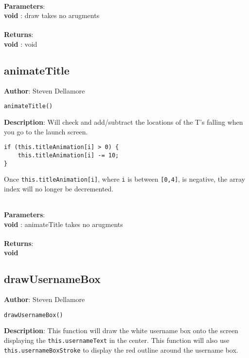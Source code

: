 \documentclass[12pt]{article}
\begin{document}
\textbf{\large{\\Parameters}}:\\
\textbf{void }: draw takes no arugments\\\textbf{\large{\\Returns}}:\\
\textbf{void }: void\\

\subsection{animateTitle}
\textbf{Author}: Steven Dellamore 
\vspace*{1\baselineskip}
\begin{lstlisting}
animateTitle()
\end{lstlisting} 
\vspace*{1\baselineskip}
\textbf{Description}: Will check and add/subtract the locations of the T's falling when you go to the launch screen. 
\begin{verbatim}
if (this.titleAnimation[i] > 0) {
	this.titleAnimation[i] -= 10;
}
\end{verbatim}
 Once \texttt{this.titleAnimation[i]}, where \texttt{i} is between \texttt{[0,4]}, is negative, the array index will no longer be decremented. 


\textbf{\large{\\Parameters}}:\\
\textbf{void }: animateTitle takes no arugments\\\textbf{\large{\\Returns}}:\\
\textbf{void}

\subsection{drawUsernameBox}
\textbf{Author}: Steven Dellamore 
\vspace*{1\baselineskip}
\begin{lstlisting}
drawUsernameBox()
\end{lstlisting} 
\vspace*{1\baselineskip}
\textbf{Description}: This function will draw the white username box onto the screen displaying the \texttt{this.usernameText} in the center. This function will also use \texttt{this.usernameBoxStroke} to display the red outline around the username box. 
\end{document}
